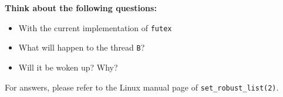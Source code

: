 \textbf{Think about the following questions:}

\begin{itemize}
    \item With the current implementation of \texttt{futex}
    \item What will happen to the thread \texttt{B}?
    \item Will it be woken up? Why?
\end{itemize}

\noindent
For answers, please refer to the Linux manual page of \texttt{set\_robust\_list(2)}.
